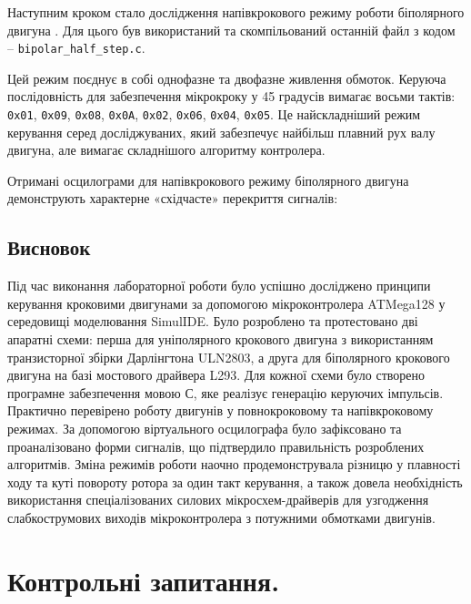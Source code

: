 \documentclass[14pt, a4paper]{extreport}
\begin{document}
	
	Наступним кроком стало дослідження напівкрокового режиму роботи біполярного двигуна . Для цього був використаний та скомпільований останній файл з кодом -- \texttt{bipolar\_half\_step.c}. 
	
	Цей режим поєднує в собі однофазне та двофазне живлення обмоток. Керуюча послідовність для забезпечення мікрокроку у 45 градусів вимагає восьми тактів: \texttt{0x01}, \texttt{0x09}, \texttt{0x08}, \texttt{0x0A}, \texttt{0x02}, \texttt{0x06}, \texttt{0x04}, \texttt{0x05}. Це найскладніший режим керування серед досліджуваних, який забезпечує найбільш плавний рух валу двигуна, але вимагає складнішого алгоритму контролера.
	
	Отримані осцилограми для напівкрокового режиму біполярного двигуна демонструють характерне «східчасте» перекриття сигналів:
	
	
	\subsection*{Висновок}
	
	Під час виконання лабораторної роботи було успішно досліджено принципи керування кроковими двигунами за допомогою мікроконтролера ATMega128 у середовищі моделювання SimulIDE. Було розроблено та протестовано дві апаратні схеми: перша для уніполярного крокового двигуна з використанням транзисторної збірки Дарлінгтона ULN2803, а друга для біполярного крокового двигуна на базі мостового драйвера L293. Для кожної схеми було створено програмне забезпечення мовою С, яке реалізує генерацію керуючих імпульсів. Практично перевірено роботу двигунів у повнокроковому та напівкроковому режимах. За допомогою віртуального осцилографа було зафіксовано та проаналізовано форми сигналів, що підтвердило правильність розроблених алгоритмів. Зміна режимів роботи наочно продемонструвала різницю у плавності ходу та куті повороту ротора за один такт керування, а також довела необхідність використання спеціалізованих силових мікросхем-драйверів для узгодження слабкострумових виходів мікроконтролера з потужними обмотками двигунів.
	
	\section*{Контрольні запитання.}
	
\end{document}
